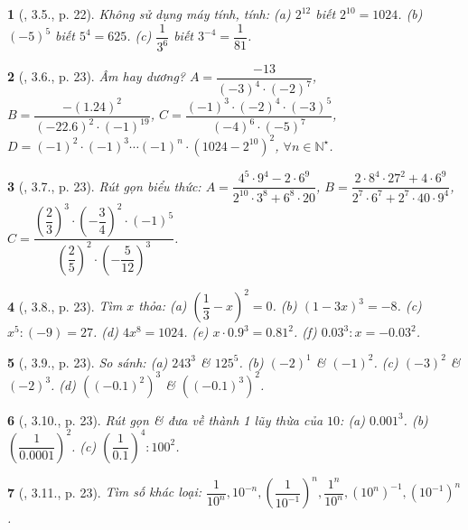 \documentclass{article}
\newtheorem{baitoan}{}
\begin{document}
\begin{baitoan}[\cite{Binh_boi_duong_Toan_7_tap_1}, 3.5., p. 22]
	Không sử dụng máy tính,  tính: (a) $2^{12}$ biết $2^{10} = 1024$. (b) $(-5)^5$ biết $5^4 = 625$. (c) $\dfrac{1}{3^6}$ biết $3^{-4} = \dfrac{1}{81}$.
\end{baitoan}

\begin{baitoan}[\cite{Binh_boi_duong_Toan_7_tap_1}, 3.6., p. 23]
	Âm hay dương? $A = \dfrac{-13}{(-3)^4\cdot(-2)^7}$, $B = \dfrac{-(1.24)^2}{(-22.6)^2\cdot(-1)^{19}}$, $C = \dfrac{(-1)^3\cdot(-2)^4\cdot(-3)^5}{(-4)^6\cdot(-5)^7}$, $D = (-1)^2\cdot(-1)^3\cdots(-1)^n\cdot(1024 - 2^{10})^2$, $\forall n\in\mathbb{N}^\star$.
\end{baitoan}

\begin{baitoan}[\cite{Binh_boi_duong_Toan_7_tap_1}, 3.7., p. 23]
	Rút gọn biểu thức: $A = \dfrac{4^5\cdot9^4 - 2\cdot6^9}{2^{10}\cdot3^8 + 6^8\cdot20}$, $B = \dfrac{2\cdot8^4\cdot27^2 + 4\cdot6^9}{2^7\cdot6^7 + 2^7\cdot40\cdot9^4}$, $C = \dfrac{\left(\dfrac{2}{3}\right)^3\cdot\left(-\dfrac{3}{4}\right)^2\cdot(-1)^5}{\left(\dfrac{2}{5}\right)^2\cdot\left(-\dfrac{5}{12}\right)^3}$.
\end{baitoan}

\begin{baitoan}[\cite{Binh_boi_duong_Toan_7_tap_1}, 3.8., p. 23]
	Tìm $x$ thỏa: (a) $\left(\dfrac{1}{3} - x\right)^2 = 0$. (b) $(1 - 3x)^3 = -8$. (c) $x^5:(-9) = 27$. (d) $4x^8 = 1024$. (e) $x\cdot0.9^3 = 0.81^2$. (f) $0.03^3:x = -0.03^2$.
\end{baitoan}

\begin{baitoan}[\cite{Binh_boi_duong_Toan_7_tap_1}, 3.9., p. 23]
	So sánh: (a) $243^3$ \& $125^5$. (b) $(-2)^1$ \& $(-1)^2$. (c) $(-3)^2$ \& $(-2)^3$. (d) $((-0.1)^2)^3$ \& $((-0.1)^3)^2$.
\end{baitoan}

\begin{baitoan}[\cite{Binh_boi_duong_Toan_7_tap_1}, 3.10., p. 23]
	Rút gọn \& đưa về thành 1 lũy thừa của $10$: (a) $0.001^3$. (b) $\left(\dfrac{1}{0.0001}\right)^2$. (c) $\left(\dfrac{1}{0.1}\right)^4:100^2$.
\end{baitoan}

\begin{baitoan}[\cite{Binh_boi_duong_Toan_7_tap_1}, 3.11., p. 23]
	Tìm số khác loại: $\dfrac{1}{10^n},10^{-n},\left(\dfrac{1}{10^{-1}}\right)^n,\dfrac{1^n}{10^n},(10^n)^{-1},(10^{-1})^n$.
\end{baitoan}
\end{document}
